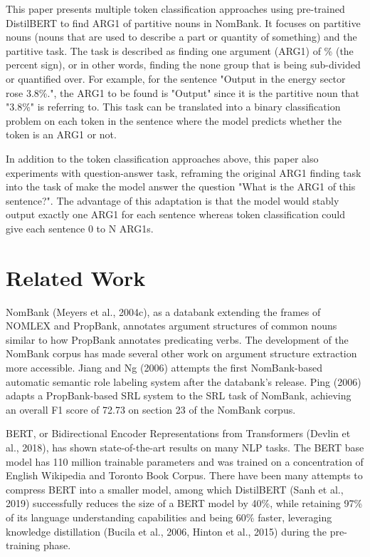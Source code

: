 \documentclass[11pt]{article}
\begin{document}
This paper presents multiple token classification approaches using pre-trained DistilBERT to find ARG1 of partitive nouns in NomBank. It focuses on partitive nouns (nouns that are used to describe a part or quantity of something) and the partitive task. The task is described as finding one argument (ARG1) of \% (the percent sign), or in other words, finding the none group that is being sub-divided or quantified over. For example, for the sentence "Output in the energy sector rose 3.8\%.", the ARG1 to be found is "Output" since it is the partitive noun that "3.8\%" is referring to. This task can be translated into a binary classification problem on each token in the sentence where the model predicts whether the token is an ARG1 or not.

In addition to the token classification approaches above, this paper also experiments with question-answer task, reframing the original ARG1 finding task into the task of make the model answer the question "What is the ARG1 of this sentence?". The advantage of this adaptation is that the model would stably output exactly one ARG1 for each sentence whereas token classification could give each sentence 0 to N ARG1s.


\section{Related Work}

NomBank (Meyers et al., 2004c), as a databank extending the frames of NOMLEX and PropBank, annotates argument structures of common nouns similar to how PropBank annotates predicating verbs. The development of the NomBank corpus has made several other work on argument structure extraction more accessible. Jiang and Ng (2006) attempts the first NomBank-based automatic semantic role labeling system after the databank's release. Ping (2006)  adapts a PropBank-based SRL system to the SRL task of NomBank, achieving an overall F1 score of 72.73 on section 23 of the NomBank corpus.

BERT, or Bidirectional Encoder Representations from Transformers (Devlin et al., 2018), has shown state-of-the-art results on many NLP tasks. The BERT base model has 110 million trainable parameters and was trained on a concentration of English Wikipedia and Toronto Book Corpus. There have been many attempts to compress BERT into a smaller model, among which DistilBERT (Sanh et al., 2019) successfully reduces the size of a BERT model by 40\%, while retaining 97\% of its language understanding capabilities and being 60\% faster, leveraging  knowledge distillation (Bucila et al., 2006, Hinton et al., 2015) during the pre-training phase.
\end{document}
